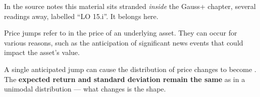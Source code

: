 
\begin{mrtrapbox}[title={Where this page came from}]
In the source notes this material sits stranded \textit{inside} the Gauss+ chapter, several
readings away, labelled ``LO 15.i''. It belongs here.
\end{mrtrapbox}

\begin{mrdefbox}[title={Price jumps}]
Price jumps refer to  in the price of an underlying
asset. They can occur for various reasons, such as the anticipation of significant news events
that could impact the asset's value.
\end{mrdefbox}

\begin{mrkeybox}[title={Effect on the distribution}]
A single anticipated jump can cause the distribution of price changes to become .
The \textbf{expected return and standard deviation remain the same} as in a unimodal
distribution --- what changes is the shape.
\end{mrkeybox}

